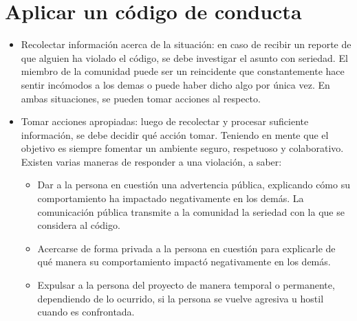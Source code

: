 \section{Aplicar un código de conducta}

\begin{itemize}
	\item Recolectar información acerca de la situación: en caso de recibir un reporte de que alguien ha violado el código, se debe investigar el asunto con seriedad. El miembro de la comunidad puede ser un reincidente que constantemente hace sentir incómodos a los demas o puede haber dicho algo por única vez. En ambas situaciones, se pueden tomar acciones al respecto.
	\item Tomar acciones apropiadas: luego de recolectar y procesar suficiente información, se debe decidir qué acción tomar. Teniendo en mente que el objetivo es siempre fomentar un ambiente seguro, respetuoso y colaborativo. Existen varias maneras de responder a una violación, a saber:
	\begin{itemize}
		\item Dar a la persona en cuestión una advertencia pública, explicando cómo su comportamiento ha impactado negativamente en los demás. La comunicación pública transmite a la comunidad la seriedad con la que se considera al código.
		\item Acercarse de forma privada a la persona en cuestión para explicarle de qué manera su comportamiento impactó negativamente en los demás. 
		\item Expulsar a la persona del proyecto de manera temporal o permanente, dependiendo de lo ocurrido, si la persona se vuelve agresiva u hostil cuando es confrontada.
	\end{itemize}
\end{itemize}

